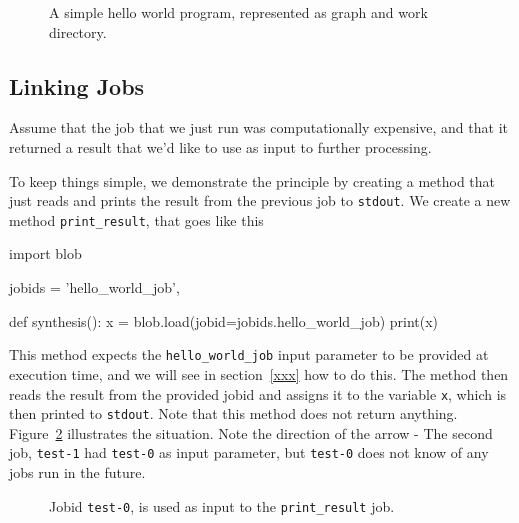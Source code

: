 \documentclass[a4paper]{article}
\begin{document}
\begin{figure}[h!]
  \begin{center}
    
    \caption{A simple hello world program, represented as graph and
      work directory.}
    \label{fig:execflow-hello-world}
  \end{center}
\end{figure}

\clearpage





\subsection{Linking Jobs}
Assume that the job that we just run was computationally expensive,
and that it returned a result that we'd like to use as input to further
processing.

To keep things simple, we demonstrate the principle by creating a
method that just reads and prints the result from the previous job to
\texttt{stdout}.  We create a new method \texttt{print\_result}, that
goes like this

\begin{python}
import blob
  
jobids = {'hello_world_job',}

def synthesis():
    x = blob.load(jobid=jobids.hello_world_job)
    print(x)
\end{python}

This method expects the \texttt{hello\_world\_job} input parameter to
be provided at execution time, and we will see in section~\ref{xxx}
how to do this.  The method then reads the result from the provided
jobid and assigns it to the variable \texttt{x}, which is then printed
to \texttt{stdout}.  Note that this method does not return anything.
Figure~\ref{fig:execflow-print-result} illustrates the situation.
Note the direction of the arrow - The second job, \texttt{test-1} had
\texttt{test-0} as input parameter, but \texttt{test-0} does not know
of any jobs run in the future.

\begin{figure}[h!]
  \begin{center}
    
    \caption{Jobid \texttt{test-0}, is used as input to the
      \texttt{print\_result} job.}
    \label{fig:execflow-print-result}
  \end{center}
\end{figure}
\end{document}
